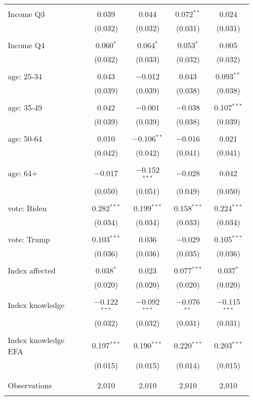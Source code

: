 \begin{tabular}{@{\extracolsep{5pt}}lcccc}
  & & & & \\ 
 Income Q3 & 0.039 & 0.044 & 0.072$^{**}$ & 0.024 \\ 
  & (0.032) & (0.032) & (0.031) & (0.031) \\ 
  & & & & \\ 
 Income Q4 & 0.060$^{*}$ & 0.064$^{*}$ & 0.053$^{*}$ & 0.005 \\ 
  & (0.032) & (0.033) & (0.032) & (0.032) \\ 
  & & & & \\ 
 age: 25-34 & 0.043 & $-$0.012 & 0.043 & 0.093$^{**}$ \\ 
  & (0.039) & (0.039) & (0.038) & (0.038) \\ 
  & & & & \\ 
 age: 35-49 & 0.042 & $-$0.001 & $-$0.038 & 0.107$^{***}$ \\ 
  & (0.039) & (0.039) & (0.038) & (0.039) \\ 
  & & & & \\ 
 age: 50-64 & 0.010 & $-$0.106$^{**}$ & $-$0.016 & 0.021 \\ 
  & (0.042) & (0.042) & (0.041) & (0.041) \\ 
  & & & & \\ 
 age: 64+ & $-$0.017 & $-$0.152$^{***}$ & $-$0.028 & 0.042 \\ 
  & (0.050) & (0.051) & (0.049) & (0.050) \\ 
  & & & & \\ 
 vote: Biden & 0.282$^{***}$ & 0.199$^{***}$ & 0.158$^{***}$ & 0.224$^{***}$ \\ 
  & (0.034) & (0.034) & (0.033) & (0.034) \\ 
  & & & & \\ 
 vote: Trump & 0.103$^{***}$ & 0.036 & $-$0.029 & 0.105$^{***}$ \\ 
  & (0.036) & (0.036) & (0.035) & (0.036) \\ 
  & & & & \\ 
 Index affected & 0.038$^{*}$ & 0.023 & 0.077$^{***}$ & 0.037$^{*}$ \\ 
  & (0.020) & (0.020) & (0.020) & (0.020) \\ 
  & & & & \\ 
 Index knowledge & $-$0.122$^{***}$ & $-$0.092$^{***}$ & $-$0.076$^{**}$ & $-$0.115$^{***}$ \\ 
  & (0.032) & (0.032) & (0.031) & (0.031) \\ 
  & & & & \\ 
 Index knowledge EFA & 0.197$^{***}$ & 0.190$^{***}$ & 0.220$^{***}$ & 0.203$^{***}$ \\ 
  & (0.015) & (0.015) & (0.014) & (0.015) \\ 
  & & & & \\ 
\hline \\[-1.8ex] 

Observations & 2,010 & 2,010 & 2,010 & 2,010 \\ 
\hline 
\hline \\[-1.8ex] 
\end{tabular} 